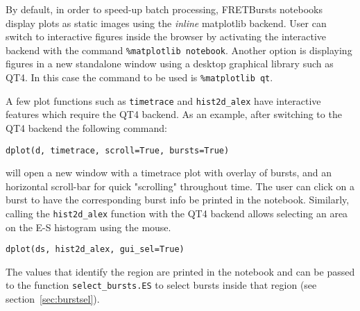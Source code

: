 By default, in order to speed-up batch processing, FRETBursts notebooks display plots
as static images using the \textit{inline} matplotlib backend.
User can switch to interactive figures inside the browser by activating
the interactive backend with the command \verb|%matplotlib notebook|.
Another option is displaying figures in a new standalone window
using a desktop graphical library such as QT4.
In this case the command to be used is \verb|%matplotlib qt|.

A few plot functions such as \verb|timetrace| and \verb|hist2d_alex| have interactive features
which require the QT4 backend. As an example, after switching to the QT4 backend
the following command:

\begin{lstlisting}
dplot(d, timetrace, scroll=True, bursts=True)
\end{lstlisting}

\noindent
will open a new window with a timetrace plot with overlay of bursts, and an horizontal scroll-bar for quick
"scrolling" throughout time. The user can click on a burst to have the corresponding burst info
be printed in the notebook.
Similarly, calling the \verb|hist2d_alex| function with the QT4 backend allows
selecting an area on the E-S histogram using the mouse.

\begin{lstlisting}
dplot(ds, hist2d_alex, gui_sel=True)
\end{lstlisting}

The values that identify the region are printed in the notebook and can be passed
to the function \verb|select_bursts.ES| to select bursts inside that region
(see section~\ref{sec:burstsel}).
